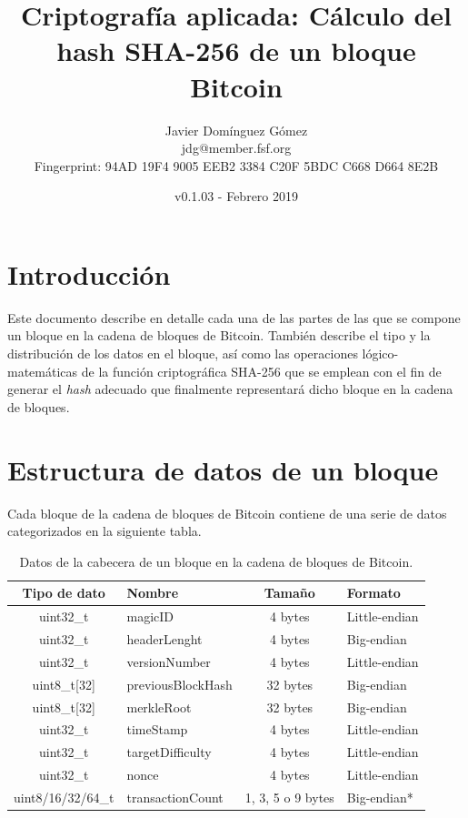 \documentclass{article}
\title{\textbf{Criptografía aplicada: Cálculo del hash SHA-256 de un bloque Bitcoin}}
\author{Javier Domínguez Gómez \\
\small{jdg@member.fsf.org} \\
\small{Fingerprint: 94AD 19F4 9005 EEB2 3384 C20F 5BDC C668 D664 8E2B}}
\date{v0.1.03 - Febrero 2019}
\begin{document}
\maketitle

\tableofcontents{}

\section{Introducción}
    Este documento describe en detalle cada una de las partes de las que se compone un bloque en la cadena de bloques de Bitcoin. También describe el tipo y la distribución de los datos en el bloque, así como las operaciones lógico-matemáticas de la función criptográfica SHA-256 que se emplean con el fin de generar el \textit{hash} adecuado que finalmente representará dicho bloque en la cadena de bloques.

\section{Estructura de datos de un bloque}
    \vspace{3mm}
    Cada bloque de la cadena de bloques de Bitcoin contiene de una serie de datos categorizados en la siguiente tabla.
    \begin{table}[H]
    \centering
    \begin{tabular}{| c | l | c | l |} 
        \hline
        Tipo de dato & Nombre & Tamaño & Formato \\
        \hline
        uint32\_t & magicID & 4 bytes & Little-endian \\
        \hline
        uint32\_t & headerLenght & 4 bytes & Big-endian \\
        \hline
        uint32\_t & versionNumber & 4 bytes & Little-endian \\
        \hline
        uint8\_t[32] & previousBlockHash & 32 bytes & Big-endian \\
        \hline
        uint8\_t[32] & merkleRoot & 32 bytes & Big-endian \\
        \hline
        uint32\_t & timeStamp & 4 bytes & Little-endian \\
        \hline
        uint32\_t & targetDifficulty & 4 bytes & Little-endian \\
        \hline
        uint32\_t & nonce & 4 bytes & Little-endian \\
        \hline
        uint8/16/32/64\_t & transactionCount & 1, 3, 5 o 9 bytes & Big-endian*  \\
        \hline
    \end{tabular}
    \caption{Datos de la cabecera de un bloque en la cadena de bloques de Bitcoin.}
    \label{table:0}
    \end{table}
    
\end{document}
